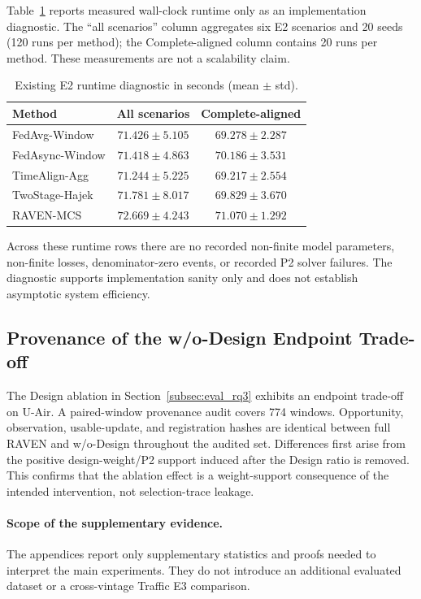 \documentclass[letterpaper,journal]{IEEEtran}
\begin{document}
Table~\ref{tab:app_runtime} reports measured wall-clock runtime only as an
implementation diagnostic.  The ``all scenarios'' column aggregates six
E2 scenarios and 20 seeds (120 runs per method); the Complete-aligned column
contains 20 runs per method.  These measurements are not a scalability claim.

\begin{table}[t]
\centering
\caption{Existing E2 runtime diagnostic in seconds (mean $\pm$ std).}
\label{tab:app_runtime}
\footnotesize
\setlength{\tabcolsep}{4.5pt}
\begin{tabular*}{\textwidth}{@{\extracolsep{\fill}}lcc}
\toprule
Method & All scenarios & Complete-aligned\\
\midrule
FedAvg-Window & $71.426\pm5.105$ & $69.278\pm2.287$ \\
FedAsync-Window & $71.418\pm4.863$ & $70.186\pm3.531$ \\
TimeAlign-Agg & $71.244\pm5.225$ & $69.217\pm2.554$ \\
TwoStage-Hajek & $71.781\pm8.017$ & $69.829\pm3.670$ \\
RAVEN-MCS & $72.669\pm4.243$ & $71.070\pm1.292$ \\
\bottomrule
\end{tabular*}
\end{table}

Across these runtime rows there are no recorded non-finite model
parameters, non-finite losses, denominator-zero events, or recorded P2 solver
failures.  The diagnostic supports implementation sanity only and does not
establish asymptotic system efficiency.

\subsection{Provenance of the w/o-Design Endpoint Trade-off}
\label{app:design_provenance}

The Design ablation in Section~\ref{subsec:eval_rq3} exhibits an endpoint
trade-off on U-Air.  A paired-window provenance audit covers
774 windows.  Opportunity, observation, usable-update, and
registration hashes are identical between full RAVEN and w/o-Design throughout
the audited set.  Differences first arise from the positive design-weight/P2
support induced after the Design ratio is removed.  This confirms that the
ablation effect is a weight-support consequence of the intended intervention,
not selection-trace leakage.

\paragraph{Scope of the supplementary evidence.}
The appendices report only supplementary statistics and proofs needed to
interpret the main experiments.  They do not introduce an additional
evaluated dataset or a cross-vintage Traffic E3 comparison.

\FloatBarrier
\clearpage


\end{document}
